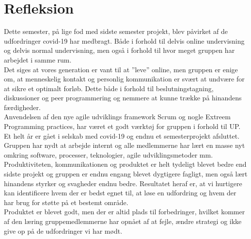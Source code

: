 \chapter{Refleksion}\label{ch:refleksion}
Dette semester, på lige fod med sidste semester projekt, blev påvirket af de udfordringer covid-19 har medbragt.
Både i forhold til delvis online undervisning og delvis normal undervisning, 
men også i forhold til hvor meget gruppen har arbejdet i samme rum. \\

Det siges at vores generation er vant til at ”leve” online, men gruppen er enige om, 
at menneskelig kontakt og personlig kommunikation er svært at undvære for at sikre et optimalt forløb. 
Dette både i forhold til beslutningstagning, diskussioner og peer programmering og 
nemmere at kunne trække på hinandens færdigheder. \\

Anvendelsen af den nye agile udviklings framework Scrum og nogle Extreem Programming practices, 
har været et godt værktøj for gruppen i forhold til UP. \\

Et helt år er gået i selskab med covid-19 og endnu et semesterprojekt afsluttet. 
Gruppen har nydt at arbejde internt og alle medlemmerne har lært en masse nyt 
omkring software, processer, teknologier, agile udviklingsmetoder mm. \\

Produktiviteten, kommunikationen og produktet er helt tydeligt blevet bedre end sidste 
projekt og gruppen er endnu engang blevet dygtigere fagligt, 
men også lært hinandens styrker og svagheder endnu bedre. Resultatet heraf er, 
at vi hurtigere kan identificere hvem der er bedst egnet til, 
at løse en udfordring og hvem der har brug for støtte på et bestemt område. \\

Produktet er blevet godt, men der er altid plads til forbedringer, 
hvilket kommer af den læring gruppemedlemmerne har opnået af at fejle, 
ændre strategi og ikke give op på de udfordringer vi har mødt.
